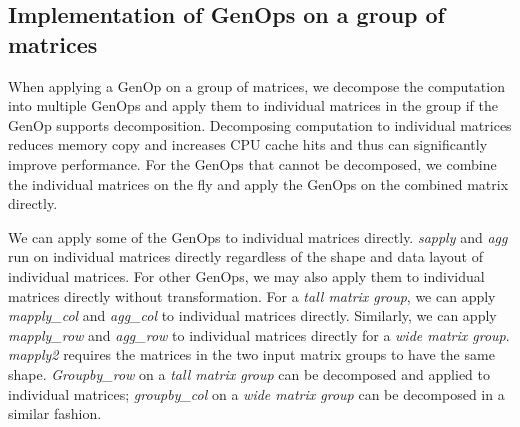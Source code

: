 


\subsection{Implementation of GenOps on a group of matrices}

When applying a GenOp on a group of matrices,
we decompose the computation into multiple GenOps and apply them to individual
matrices in the group if the GenOp supports decomposition. Decomposing computation
to individual matrices reduces memory copy and increases CPU cache hits and thus
can significantly improve performance. For the GenOps that cannot be decomposed,
we combine the individual matrices on the fly and apply the GenOps on the combined
matrix directly.

We can apply some of the GenOps to individual matrices directly. \textit{sapply}
and \textit{agg} run on individual matrices directly regardless of the shape
and data layout of individual matrices. For other GenOps, we may also apply
them to individual matrices directly without transformation. For a
\textit{tall matrix group}, we can apply \textit{mapply\_col} and \textit{agg\_col}
to individual matrices directly.
Similarly, we can apply \textit{mapply\_row} and \textit{agg\_row} to
individual matrices directly for a \textit{wide matrix group}. \textit{mapply2}
requires the matrices in the two input matrix groups to have the same shape.
\textit{Groupby\_row} on a \textit{tall matrix group} can be decomposed and
applied to individual matrices; \textit{groupby\_col} on a \textit{wide matrix group}
can be decomposed in a similar fashion.

